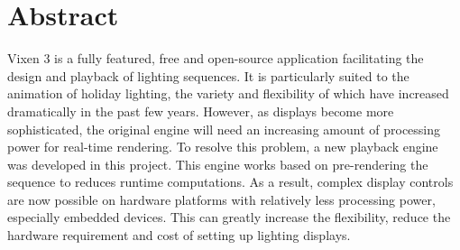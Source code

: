 \renewcommand{\baselinestretch}{1.5}
\chapter{Abstract}
\renewcommand{\baselinestretch}{\mystretch}


Vixen 3 is a fully featured, free and open-source application facilitating the design and playback of lighting sequences. It is particularly suited to the animation of holiday lighting, the variety and flexibility of which have increased dramatically in the past few years. However, as displays become more sophisticated, the original engine will need an increasing amount of processing power for real-time rendering. To resolve this problem, a new playback engine was developed in this project. This engine works based on pre-rendering the sequence to reduces runtime computations. As a result, complex display controls are now possible on hardware platforms with relatively less processing power, especially embedded devices. This can greatly increase the flexibility, reduce the hardware requirement and cost of setting up lighting displays.
